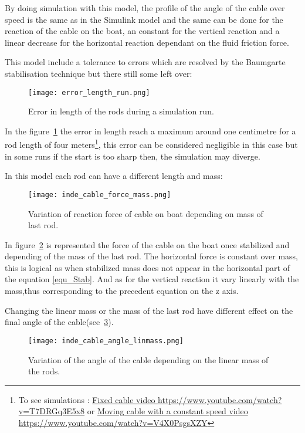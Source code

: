 By doing simulation with this model, the profile of the angle of the cable over speed is the same as in the Simulink model and the same can be done for the reaction of the cable on the boat, an constant for the vertical reaction and a linear decrease for the horizontal reaction dependant on the fluid friction force.

This model include a tolerance to errors which are resolved by the Baumgarte stabilisation technique but 
there still some left over:


\begin{figure}[H]
\centering
    \texttt{[image: error\_length\_run.png]}
    \caption{Error in length of the rods during a simulation run.}
    \label{fig:errorLRod}
\end{figure}

In the figure~\ref{fig:errorLRod} the error in length reach a maximum around one centimetre for a rod length of four meters\footnote{To see simulations : \href{https://www.youtube.com/watch?v=T7DRGq3E5x8}{Fixed cable video https://www.youtube.com/watch?v=T7DRGq3E5x8} or \href{https://www.youtube.com/watch?v=V4X0PsgsXZY}{Moving cable with a constant speed video https://www.youtube.com/watch?v=V4X0PsgsXZY}}, this error can be considered negligible in this case but in some runs if the start is too sharp then, the simulation may diverge.

In this model each rod can have a different length and mass:

\begin{figure}[H]
\centering
    \texttt{[image: inde\_cable\_force\_mass.png]}
    \caption{Variation of reaction force of cable on boat depending on mass of last rod.}
    \label{fig:massForce}
\end{figure}

In figure~\ref{fig:massForce} is represented the force of the cable on the boat once stabilized and depending of the mass of the last rod. The horizontal force is constant over mass, this is logical as when stabilized mass does not appear in the horizontal part of the equation \eqref{equ_Stab}. And as for the vertical reaction it vary linearly with the mass,thus corresponding to the precedent equation on the z axis.

Changing the linear mass or the mass of the last rod have different effect on the final angle of the cable(see~\ref{fig:linmassAngle}).

\begin{figure}[H]
\centering
    \texttt{[image: inde\_cable\_angle\_linmass.png]}
    \caption{Variation of the angle of the cable depending on the linear mass of the rods.}
    \label{fig:linmassAngle}
\end{figure}

